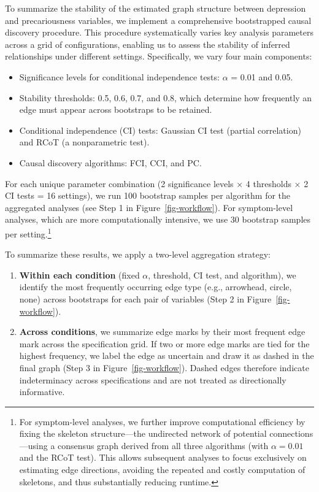 \documentclass[
]{article}
\providecommand{\tightlist}{%
  \setlength{\itemsep}{0pt}\setlength{\parskip}{0pt}}\usepackage{longtable,booktabs,array}
\begin{document}
To summarize the stability of the estimated graph structure between
depression and precariousness variables, we implement a comprehensive
bootstrapped causal discovery procedure. This procedure systematically
varies key analysis parameters across a grid of configurations, enabling
us to assess the stability of inferred relationships under different
settings. Specifically, we vary four main components:

\begin{itemize}
\tightlist
\item
  Significance levels for conditional independence tests: \(\alpha\) =
  0.01 and 0.05.
\item
  Stability thresholds: 0.5, 0.6, 0.7, and 0.8, which determine how
  frequently an edge must appear across bootstraps to be retained.
\item
  Conditional independence (CI) tests: Gaussian CI test (partial
  correlation) and RCoT (a nonparametric test).
\item
  Causal discovery algorithms: FCI, CCI, and PC.
\end{itemize}

For each unique parameter combination (2 significance levels × 4
thresholds × 2 CI tests = 16 settings), we run 100 bootstrap samples per
algorithm for the aggregated analyses (see Step 1 in
Figure~\ref{fig-workflow}). For symptom-level analyses, which are more
computationally intensive, we use 30 bootstrap samples per
setting.\footnote{For symptom-level analyses, we further improve
  computational efficiency by fixing the skeleton structure---the
  undirected network of potential connections---using a consensus graph
  derived from all three algorithms (with \(\alpha = 0.01\) and the RCoT
  test). This allows subsequent analyses to focus exclusively on
  estimating edge directions, avoiding the repeated and costly
  computation of skeletons, and thus substantially reducing runtime.}

To summarize these results, we apply a two-level aggregation strategy:

\begin{enumerate}
\def\labelenumi{\arabic{enumi}.}
\tightlist
\item
  \textbf{Within each condition} (fixed \(\alpha\), threshold, CI test,
  and algorithm), we identify the most frequently occurring edge type
  (e.g., arrowhead, circle, none) across bootstraps for each pair of
  variables (Step 2 in Figure~\ref{fig-workflow}).
\item
  \textbf{Across conditions}, we summarize edge marks by their most
  frequent edge mark across the specification grid. If two or more edge
  marks are tied for the highest frequency, we label the edge as
  uncertain and draw it as dashed in the final graph (Step 3 in
  Figure~\ref{fig-workflow}). Dashed edges therefore indicate
  indeterminacy across specifications and are not treated as
  directionally informative.
\end{enumerate}
\end{document}
